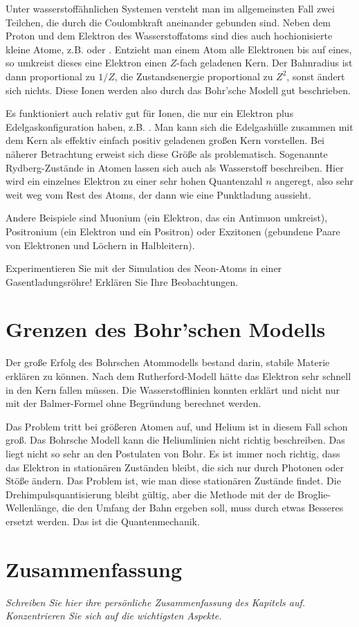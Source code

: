 Unter wasserstoffähnlichen Systemen versteht man im allgemeinsten Fall zwei Teilchen, die durch die Coulombkraft aneinander gebunden sind. Neben dem Proton und dem Elektron des Wasserstoffatoms sind dies auch hochionisierte kleine Atome, z.B.  oder . Entzieht man einem Atom alle Elektronen bis auf eines, so umkreist dieses eine Elektron einen $Z$-fach geladenen Kern. Der Bahnradius ist dann proportional zu $1/Z$, die Zustandsenergie proportional zu $Z^2$, sonst ändert sich nichts. Diese Ionen werden also durch das Bohr'sche Modell gut beschrieben. 

Es funktioniert auch relativ gut für Ionen, die nur ein Elektron plus Edelgaskonfiguration haben, z.B. . Man kann sich die Edelgashülle zusammen mit dem Kern als effektiv einfach positiv geladenen großen Kern vorstellen. Bei näherer Betrachtung erweist sich diese Größe als problematisch. Sogenannte Rydberg-Zustände in Atomen lassen sich auch als Wasserstoff beschreiben. Hier wird ein einzelnes Elektron zu einer sehr hohen Quantenzahl $n$ angeregt, also sehr weit weg vom Rest des Atoms, der dann wie eine Punktladung aussieht. 

Andere Beispiele sind Muonium (ein Elektron, das ein Antimuon umkreist), Positronium (ein Elektron und ein Positron) oder Exzitonen (gebundene Paare von Elektronen und Löchern in Halbleitern). 

\begin{questions}
    \item Experimentieren Sie mit der Simulation des Neon-Atoms in einer Gasentladungsröhre! Erklären Sie Ihre Beobachtungen.
\end{questions}


\section{Grenzen des Bohr'schen Modells}

Der große Erfolg des Bohrschen Atommodells bestand darin, stabile Materie erklären zu können. Nach dem Rutherford-Modell hätte das Elektron sehr schnell in den Kern fallen müssen. Die Wasserstofflinien konnten erklärt und nicht nur mit der Balmer-Formel ohne Begründung berechnet werden.

Das Problem tritt bei größeren Atomen auf, und Helium ist in diesem Fall schon groß. Das Bohrsche Modell kann die Heliumlinien nicht richtig beschreiben. Das liegt nicht so sehr an den Postulaten von Bohr. Es ist immer noch richtig, dass das Elektron in stationären Zuständen bleibt, die sich nur durch Photonen oder Stöße ändern. Das Problem ist, wie man diese stationären Zustände findet. Die Drehimpulsquantisierung bleibt gültig, aber die Methode mit der de Broglie-Wellenlänge, die den Umfang der Bahn ergeben soll, muss durch etwas Besseres ersetzt werden. Das ist die Quantenmechanik.



\section{Zusammenfassung}

\textit{Schreiben Sie hier ihre persönliche Zusammenfassung des Kapitels auf. Konzentrieren Sie sich auf die wichtigsten Aspekte.}

\vspace*{10cm}


\printbibliography[segment=\therefsegment,heading=subbibliography]
